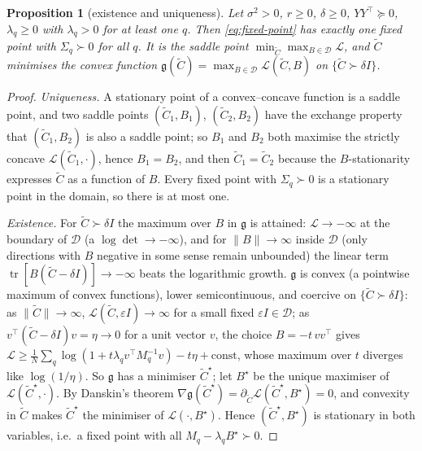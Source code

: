 \documentclass[11pt,a4paper]{article}
\newcommand{\tr}{\operatorname{tr}}
\newcommand{\Ct}{\tilde C}
\newcommand{\dom}{\mathcal D}
\newtheorem{proposition}{Proposition}
\begin{document}
\begin{proposition}[existence and uniqueness]
\label{prop:unique}
Let $\sigma^2 > 0$, $r \ge 0$, $\delta \ge 0$, $YY^\top \succeq 0$, $\lambda_q \ge 0$ with $\lambda_q > 0$ for at least one $q$. Then \eqref{eq:fixed-point} has exactly one fixed point with $\Sigma_q \succ 0$ for all $q$. It is the saddle point $\min_{\Ct}\max_{B\in\dom}\mathcal L$, and $\Ct$ minimises the convex function $\mathfrak g(\Ct) = \max_{B\in\dom}\mathcal L(\Ct,B)$ on $\{\Ct \succ \delta I\}$.
\end{proposition}
\begin{proof}
\emph{Uniqueness.} A stationary point of a convex--concave function is a saddle point, and two saddle points $(\Ct_1,B_1)$, $(\Ct_2,B_2)$ have the exchange property that $(\Ct_1,B_2)$ is also a saddle point; so $B_1$ and $B_2$ both maximise the strictly concave $\mathcal L(\Ct_1,\cdot)$, hence $B_1 = B_2$, and then $\Ct_1 = \Ct_2$ because the $B$-stationarity expresses $\Ct$ as a function of $B$. Every fixed point with $\Sigma_q\succ0$ is a stationary point in the domain, so there is at most one.

\emph{Existence.} For $\Ct \succ \delta I$ the maximum over $B$ in $\mathfrak g$ is attained: $\mathcal L \to -\infty$ at the boundary of $\dom$ (a $\log\det \to -\infty$), and for $\|B\|\to\infty$ inside $\dom$ (only directions with $B$ negative in some sense remain unbounded) the linear term $\tr[B(\Ct-\delta I)] \to -\infty$ beats the logarithmic growth. $\mathfrak g$ is convex (a pointwise maximum of convex functions), lower semicontinuous, and coercive on $\{\Ct \succ \delta I\}$: as $\|\Ct\|\to\infty$, $\mathcal L(\Ct, \varepsilon I) \to \infty$ for a small fixed $\varepsilon I \in \dom$; as $v^\top(\Ct - \delta I)v = \eta \to 0$ for a unit vector $v$, the choice $B = -t\,vv^\top$ gives $\mathcal L \ge \frac1N\sum_q\log(1 + t\lambda_q v^\top M_q^{-1}v) - t\eta + \text{const}$, whose maximum over $t$ diverges like $\log(1/\eta)$. So $\mathfrak g$ has a minimiser $\Ct^\star$; let $B^\star$ be the unique maximiser of $\mathcal L(\Ct^\star,\cdot)$. By Danskin's theorem $\nabla\mathfrak g(\Ct^\star) = \partial_{\Ct}\mathcal L(\Ct^\star,B^\star) = 0$, and convexity in $\Ct$ makes $\Ct^\star$ the minimiser of $\mathcal L(\cdot,B^\star)$. Hence $(\Ct^\star,B^\star)$ is stationary in both variables, i.e.\ a fixed point with all $M_q - \lambda_q B^\star \succ 0$.
\end{proof}
\end{document}
